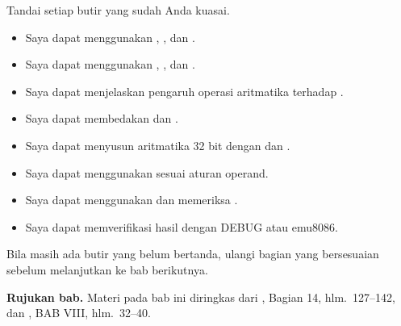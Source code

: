 \begin{checklistbox}
\vspace{1.1em}
Tandai setiap butir yang sudah Anda kuasai.

\begin{itemize}
    \item[\checkbox] Saya dapat menggunakan , ,
          dan .
    \item[\checkbox] Saya dapat menggunakan , ,
          dan .
    \item[\checkbox] Saya dapat menjelaskan pengaruh operasi
          aritmatika terhadap .
    \item[\checkbox] Saya dapat membedakan  dan .
    \item[\checkbox] Saya dapat menyusun aritmatika 32 bit dengan
           dan .
    \item[\checkbox] Saya dapat menggunakan  sesuai aturan
          operand.
    \item[\checkbox] Saya dapat menggunakan  dan memeriksa
          .
    \item[\checkbox] Saya dapat memverifikasi hasil dengan DEBUG
          atau emu8086.
\end{itemize}

\vspace{0.4em}
Bila masih ada butir yang belum bertanda, ulangi bagian yang
bersesuaian sebelum melanjutkan ke bab berikutnya.
\end{checklistbox}

\begin{infobox}
\vspace{1.1em}
\textbf{Rujukan bab.} Materi pada bab ini diringkas dari
\cite{gunawan2019}, Bagian 14, hlm.~127--142, dan
\cite{sto2001}, BAB VIII, hlm.~32--40.
\end{infobox}
